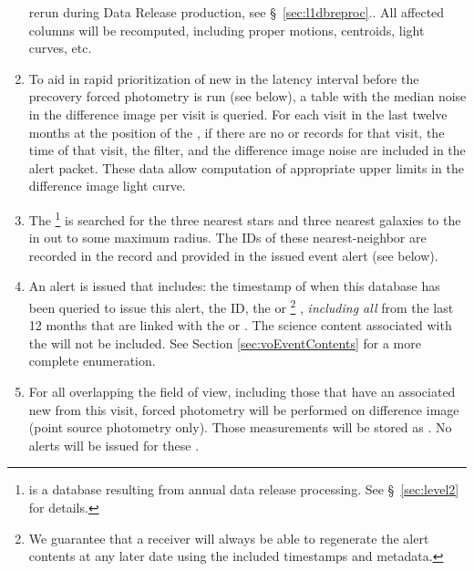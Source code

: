 \documentclass[SE,lsstdraft,toc]{lsstdoc}
\begin{document}
\begin{enumerate}
{rerun during Data Release production, see \S~\ref{sec:l1dbreproc}.}. All affected columns will be recomputed, including proper motions, centroids, light curves, etc.
\item To aid in rapid prioritization of new \DIAObjects in the latency interval before the precovery forced photometry is run (see below), a table with the median noise in the difference image per visit is queried.  For each visit in the last twelve months at the position of the \DIAObject, if there are no \DIASource or  \newtext{\DIAForcedSource} records for that visit,  the time of that visit, the filter, and the difference image noise are included in the alert packet. These data allow computation of appropriate upper limits in the difference image light curve.
\item The \DR\footnote{\DR is a database resulting from annual data release processing. See \S~\ref{sec:level2} for details.} is searched for the three nearest stars and three nearest galaxies to the \DIAObject in \Objects{} out to some maximum radius. The IDs of these nearest-neighbor \Objects are recorded in the \DIAObject record and provided in  the issued event alert (see below).
\item An alert is issued that includes:  the timestamp of when this database has been queried to issue this alert, the \DIASource ID, the  \SSObject {} or \DIAObject {} \footnote{We guarantee that a receiver will always be able to regenerate the alert contents at any later date using the included timestamps and metadata.} , \emph{including all} \DIASources {} from the last 12 months that are linked with the \SSObject or \DIAObject. The science content associated with the \DR \Objects will not be included. See Section \ref{sec:voEventContents} for a more complete enumeration.
\item For all \DIAObjects overlapping the field of view, including those that have an associated
new \DIASource from this visit, forced photometry will be performed on  difference image (point source photometry only). Those measurements will be stored as \newtext{\DIAForcedSources}.  No alerts will be issued for these \oldtext{\DIASources}.

\end{enumerate}
\end{document}

